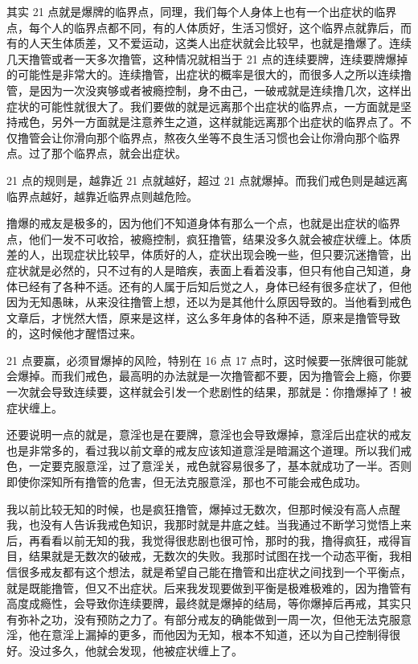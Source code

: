 \documentclass{ctexart}
\begin{document}
其实 21 点就是爆牌的临界点，同理，我们每个人身体上也有一个出症状的临界点，每个人的临界点都不同，有的人体质好，生活习惯好，这个临界点就靠后，而有的人天生体质差，又不爱运动，这类人出症状就会比较早，也就是撸爆了。连续几天撸管或者一天多次撸管，这种情况就相当于 21 点的连续要牌，连续要牌爆掉的可能性是非常大的。连续撸管，出症状的概率是很大的，而很多人之所以连续撸管，是因为一次没爽够或者被瘾控制，身不由己，一破戒就是连续撸几次，这样出症状的可能性就很大了。我们要做的就是远离那个出症状的临界点，一方面就是坚持戒色，另外一方面就是注意养生之道，这样就能远离那个出症状的临界点了。不仅撸管会让你滑向那个临界点，熬夜久坐等不良生活习惯也会让你滑向那个临界点。过了那个临界点，就会出症状。

21 点的规则是，越靠近 21 点就越好，超过 21 点就爆掉。而我们戒色则是越远离临界点越好，越靠近临界点则越危险。

撸爆的戒友是极多的，因为他们不知道身体有那么一个点，也就是出症状的临界点，他们一发不可收拾，被瘾控制，疯狂撸管，结果没多久就会被症状缠上。体质差的人，出现症状比较早，体质好的人，症状出现会晚一些，但只要沉迷撸管，出症状就是必然的，只不过有的人是暗疾，表面上看着没事，但只有他自己知道，身体已经有了各种不适。还有的人属于后知后觉之人，身体已经有很多症状了，但他因为无知愚昧，从来没往撸管上想，还以为是其他什么原因导致的。当他看到戒色文章后，才恍然大悟，原来是这样，这么多年身体的各种不适，原来是撸管导致的，这时候他才醒悟过来。

21 点要赢，必须冒爆掉的风险，特别在 16 点 17 点时，这时候要一张牌很可能就会爆掉。而我们戒色，最高明的办法就是一次撸管都不要，因为撸管会上瘾，你要一次就会导致连续要，这样就会引发一个悲剧性的结果，那就是：你撸爆掉了！被症状缠上。

还要说明一点的就是，意淫也是在要牌，意淫也会导致爆掉，意淫后出症状的戒友也是非常多的，看过我以前文章的戒友应该知道意淫是暗漏这个道理。所以我们戒色，一定要克服意淫，过了意淫关，戒色就容易很多了，基本就成功了一半。否则即使你深知所有撸管的危害，但无法克服意淫，那也不可能会戒色成功。

我以前比较无知的时候，也是疯狂撸管，爆掉过无数次，但那时候没有高人点醒我，也没有人告诉我戒色知识，我那时就是井底之蛙。当我通过不断学习觉悟上来后，再看看以前无知的我，我觉得很悲剧也很可怜，那时的我，撸得疯狂，戒得盲目，结果就是无数次的破戒，无数次的失败。我那时试图在找一个动态平衡，我相信很多戒友都有这个想法，就是希望自己能在撸管和出症状之间找到一个平衡点，就是既能撸管，但又不出症状。后来我发现要做到平衡是极难极难的，因为撸管有高度成瘾性，会导致你连续要牌，最终就是爆掉的结局，等你爆掉后再戒，其实只有弥补之功，没有预防之力了。有部分戒友的确能做到一周一次，但他无法克服意淫，他在意淫上漏掉的更多，而他因为无知，根本不知道，还以为自己控制得很好。没过多久，他就会发现，他被症状缠上了。
\end{document}
